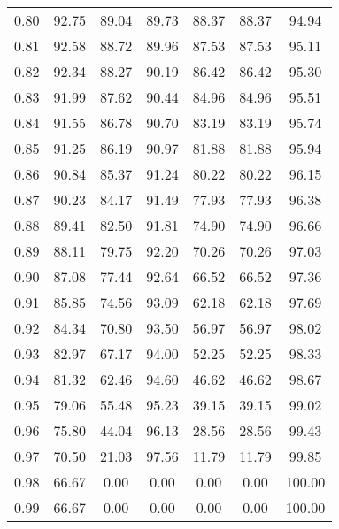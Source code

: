 \begin{tabular}{|c|c|c|c|c|c|c|}
      0.80 &     92.75 &     89.04 &      89.73 &   88.37 &      88.37 &         94.94 \\
      0.81 &     92.58 &     88.72 &      89.96 &   87.53 &      87.53 &         95.11 \\
      0.82 &     92.34 &     88.27 &      90.19 &   86.42 &      86.42 &         95.30 \\
      0.83 &     91.99 &     87.62 &      90.44 &   84.96 &      84.96 &         95.51 \\
      0.84 &     91.55 &     86.78 &      90.70 &   83.19 &      83.19 &         95.74 \\
      0.85 &     91.25 &     86.19 &      90.97 &   81.88 &      81.88 &         95.94 \\
      0.86 &     90.84 &     85.37 &      91.24 &   80.22 &      80.22 &         96.15 \\
      0.87 &     90.23 &     84.17 &      91.49 &   77.93 &      77.93 &         96.38 \\
      0.88 &     89.41 &     82.50 &      91.81 &   74.90 &      74.90 &         96.66 \\
      0.89 &     88.11 &     79.75 &      92.20 &   70.26 &      70.26 &         97.03 \\
      0.90 &     87.08 &     77.44 &      92.64 &   66.52 &      66.52 &         97.36 \\
      0.91 &     85.85 &     74.56 &      93.09 &   62.18 &      62.18 &         97.69 \\
      0.92 &     84.34 &     70.80 &      93.50 &   56.97 &      56.97 &         98.02 \\
      0.93 &     82.97 &     67.17 &      94.00 &   52.25 &      52.25 &         98.33 \\
      0.94 &     81.32 &     62.46 &      94.60 &   46.62 &      46.62 &         98.67 \\
      0.95 &     79.06 &     55.48 &      95.23 &   39.15 &      39.15 &         99.02 \\
      0.96 &     75.80 &     44.04 &      96.13 &   28.56 &      28.56 &         99.43 \\
      0.97 &     70.50 &     21.03 &      97.56 &   11.79 &      11.79 &         99.85 \\
      0.98 &     66.67 &      0.00 &       0.00 &    0.00 &       0.00 &        100.00 \\
      0.99 &     66.67 &      0.00 &       0.00 &    0.00 &       0.00 &        100.00 \\
\bottomrule
\end{tabular}
